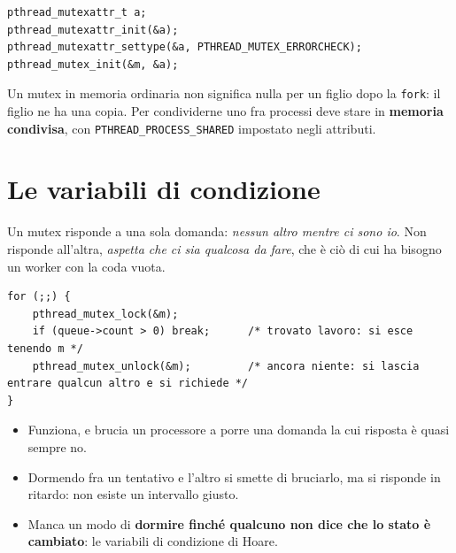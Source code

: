 \begin{lstlisting}[language={[POSIX]C}]
pthread_mutexattr_t a;
pthread_mutexattr_init(&a);
pthread_mutexattr_settype(&a, PTHREAD_MUTEX_ERRORCHECK);
pthread_mutex_init(&m, &a);
\end{lstlisting}

Un mutex in memoria ordinaria non significa nulla per un figlio dopo la \texttt{fork}: il figlio ne ha una copia. Per
condividerne uno fra processi deve stare in \textbf{memoria condivisa}, con \texttt{PTHREAD\_PROCESS\_SHARED} impostato negli
attributi.

\section{Le variabili di condizione}

Un mutex risponde a una sola domanda: \emph{nessun altro mentre ci sono io}. Non risponde all'altra, \emph{aspetta che ci
sia qualcosa da fare}, che è ciò di cui ha bisogno un worker con la coda vuota.

\begin{lstlisting}[language={[POSIX]C}, style=wnumbers, title={Aspettare con il solo mutex: attesa attiva}]
for (;;) {
    pthread_mutex_lock(&m);
    if (queue->count > 0) break;      /* trovato lavoro: si esce tenendo m */
    pthread_mutex_unlock(&m);         /* ancora niente: si lascia entrare qualcun altro e si richiede */
}
\end{lstlisting}

\begin{itemize}
    \item Funziona, e brucia un processore a porre una domanda la cui risposta è quasi sempre no.
    \item Dormendo fra un tentativo e l'altro si smette di bruciarlo, ma si risponde in ritardo: non esiste un intervallo
          giusto.
    \item Manca un modo di \textbf{dormire finché qualcuno non dice che lo stato è cambiato}: le variabili di condizione di
          Hoare.
\end{itemize}


